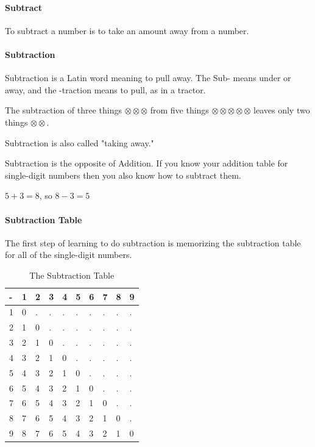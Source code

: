 \documentclass[12pt]{article}
\begin{document}
\paragraph{Subtract}
To subtract a number is to take an amount away from a number.

\paragraph{Subtraction}
Subtraction is a Latin word meaning to pull away. The Sub- means under or away, and the -traction means to pull, as in a tractor.

The subtraction of three things $\otimes\otimes\otimes$ from five things $\otimes\otimes\otimes\otimes\otimes$ leaves only two things $\otimes\otimes$.

Subtraction is also called "taking away."

Subtraction is the opposite of Addition. If you know your addition table for single-digit numbers then you also know how to subtract them.

\begin{center}
$5 + 3 = 8$, so $8 - 3 = 5$
\end{center}

\paragraph{Subtraction Table}
The first step of learning to do subtraction is memorizing the subtraction table for all of the single-digit numbers.

\begin{table}[h]
\centering
\begin{tabular}{|l|l|l|l|l|l|l|l|l|l|}
\hline
- & 1 & 2 & 3 & 4 & 5 & 6 & 7 & 8 & 9 \\ \hline
1 & 0 & . & . & . & . & . & . & . & . \\ \hline
2 & 1 & 0 & . & . & . & . & . & . & . \\ \hline
3 & 2 & 1 & 0 & . & . & . & . & . & . \\ \hline
4 & 3 & 2 & 1 & 0 & . & . & . & . & . \\ \hline
5 & 4 & 3 & 2 & 1 & 0 & . & . & . & . \\ \hline
6 & 5 & 4 & 3 & 2 & 1 & 0 & . & . & . \\ \hline
7 & 6 & 5 & 4 & 3 & 2 & 1 & 0 & . & . \\ \hline
8 & 7 & 6 & 5 & 4 & 3 & 2 & 1 & 0 & . \\ \hline
9 & 8 & 7 & 6 & 5 & 4 & 3 & 2 & 1 & 0 \\ \hline
\end{tabular}
\caption*{The Subtraction Table}
\end{table}
\end{document}

